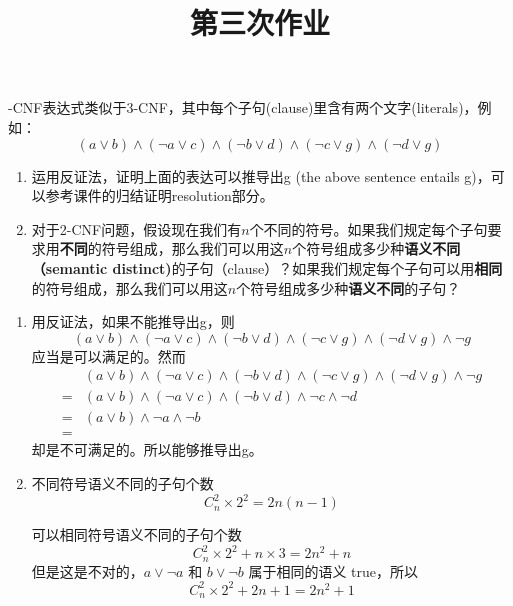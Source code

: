 \endofdump
{}

    \title{第三次作业}
    \maketitle
\begin{problem}
-CNF表达式类似于3-CNF，其中每个子句(clause)里含有两个文字(literals)，例如：
$$(a\lor b)\land (\lnot a \lor c)\land (\lnot b \lor d)\land(\lnot c \lor g)\land (\lnot d \lor g)$$
\begin{enumerate}
    \item 运用反证法，证明上面的表达可以推导出g (the above sentence entails g)，可以参考课件的归结证明resolution部分。
    \item 对于2-CNF问题，假设现在我们有$n$个不同的符号。如果我们规定每个子句要求用\textbf{不同}的符号组成，那么我们可以用这$n$个符号组成多少种\textbf{语义不同（semantic distinct)}的子句（clause）？如果我们规定每个子句可以用\textbf{相同}的符号组成，那么我们可以用这$n$个符号组成多少种\textbf{语义不同}的子句？
\end{enumerate}
\end{problem}

\begin{solution}
    \begin{enumerate}
        \item 用反证法，如果不能推导出g，则
        \begin{equation*}
            (a\lor b)\land (\lnot a \lor c)\land (\lnot b \lor d)\land(\lnot c \lor g)\land (\lnot d \lor g) \land \neg g
        \end{equation*}
        应当是可以满足的。然而
        \begin{align*}
            &(a\lor b)\land (\lnot a \lor c)\land (\lnot b \lor d)\land(\lnot c \lor g)\land (\lnot d \lor g) \land \neg g \\
            =& (a\lor b)\land (\lnot a \lor c)\land (\lnot b \lor d)\land \lnot c \land \lnot d\\
            =&  (a\lor b)\land \lnot a \land \lnot b\\
            =&  
        \end{align*}
        却是不可满足的。所以能够推导出g。
        \item 不同符号语义不同的子句个数
        \begin{equation*}
            C_{n}^2\times 2^2 = 2n(n-1)
        \end{equation*}

        可以相同符号语义不同的子句个数
        \begin{equation*}
            C_{n}^2\times 2^2 + n\times 3 = 2n^2 + n
        \end{equation*}
        但是这是不对的，$a\lor \neg a$ 和 $b \lor \neg b$ 属于相同的语义 true，所以
        \begin{equation*}
            C_{n}^2\times 2^2 + 2n + 1 = 2n^2 + 1
        \end{equation*}
    \end{enumerate}
\end{solution}

